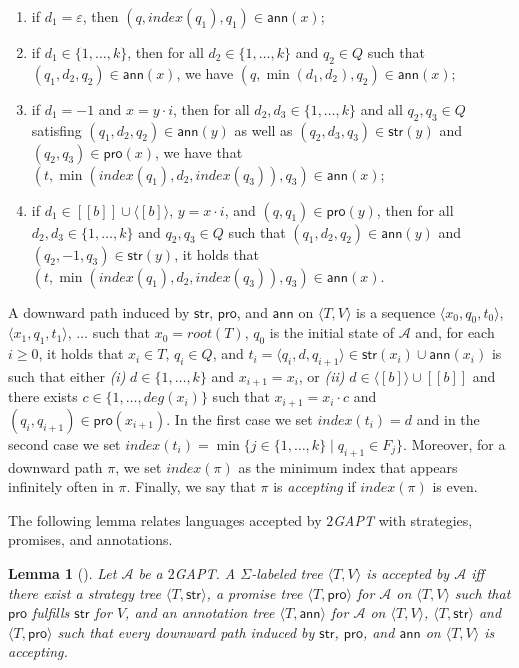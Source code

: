 \documentclass{LMCS}
\theoremstyle{plain}
\def \A             {\mathcal{A}}
\def \ann           {\ensuremath{\mathsf{ann}}\xspace}
\def \degree        {deg}
\def \prom          {\ensuremath{\mathsf{pro}}\xspace}
\def \strat         {\ensuremath{\mathsf{str}}\xspace}
\def \TGAPT         {\emph{$2$GAPT}\xspace}
\newcommand \tpl[1] {\langle #1 \rangle}
\newtheorem{lemma}{Lemma}
\begin{document}
\begin{enumerate}[$\bullet$]

\item
if $d_1 = \varepsilon$, then $(q, index(q_1), q_1) \in \ann(x)$;

\item
if $d_1 \in \{1, \ldots, k\}$, then for all $d_2 \in \{1, \ldots,
k\}$ and $q_2 \in Q$ such that $(q_1, d_2, q_2) \in \ann(x)$, we
have $(q, \min(d_1,d_2), q_2) \in \ann(x)$;

\item
if $d_1 = -1$ and $x = y \cdot i$, then for all $d_2, d_3 \in \{1,
\ldots, k\}$ and all $q_2, q_3 \in Q$ satisfing $(q_1, d_2, q_2) \in
\ann(y)$ as well as $(q_2, d_3, q_3) \in \strat(y)$ and $(q_2, q_3) \in
\prom(x)$, we have that $(t, \min(index(q_1), d_2, index(q_3)),
q_3) \in \ann(x)$;

\item
if $d_1 \in [[b]] \cup \tpl{[b]}$, $y = x \cdot i$, and $(q, q_1)
\in \prom(y)$, then for all $d_2, d_3 \in \{1, \ldots, k\}$ and
$q_2, q_3 \in Q$ such that $(q_1, d_2, q_2) \in \ann(y)$ and
$(q_2, -1, q_3) \in \strat(y)$, it holds that $(t,
\min(index(q_1), d_2, index(q_3)), q_3) \in \ann(x)$.
\end{enumerate}

A downward path induced by $\strat$, $\prom$, and $\ann$ on
$\tpl{T,V}$ is a sequence $\tpl{x_0,q_0,t_0}$,
$\tpl{x_1,q_1,t_1}$, $\ldots$ such that $x_0 = root(T)$, $q_0$ is
the initial state of $\A$ and, for each $i \geq 0$, it holds that
$x_i \in T$, $q_i \in Q$, and $t_i = \tpl{q_i, d, q_{i+1}} \in
\strat(x_i) \cup \ann(x_i)$ is such that either \emph{(i)} $d \in
\{1, \ldots, k\}$ and $x_{i+1} = x_i$, or \emph{(ii)} $d \in
\tpl{[b]} \cup [[b]]$ and there exists $c \in \{1, \ldots,
\degree(x_i)\}$ such that $x_{i+1} = x_i \cdot c$ and
$(q_i,q_{i+1}) \in \prom(x_{i+1})$. In the first case we set
$index(t_i) = d$ and in the second case we set $index(t_i) =
\min\{j \in \{1, \ldots, k\} \mid q_{i+1} \in F_j\}$. Moreover,
for a downward path $\pi$, we set $index(\pi)$ as the minimum
index that appears infinitely often in $\pi$. Finally, we say that
$\pi$ is \emph{accepting} if $index(\pi)$ is even.

The following lemma relates languages accepted by \TGAPT with
strategies, promises, and annotations.
\begin{lemma}[\cite{BLMV06}]\label{lem:TgaptAndStrategies}
Let $\A$ be a \TGAPT. A $\Sigma$-labeled tree $\tpl{T,V}$ is
accepted by $\A$ iff there exist a strategy tree $\tpl{T,\strat}$,
a promise tree $\tpl{T,\prom}$ for $\A$ on $\tpl{T,V}$ such that
$\prom$ fulfills $\strat$ for $V$, and an annotation tree
$\tpl{T,\ann}$ for $\A$ on $\tpl{T,V}$, $\tpl{T,\strat}$ and
$\tpl{T,\prom}$ such that every downward path induced by $\strat$,
$\prom$, and $\ann$ on $\tpl{T,V}$ is accepting.
\end{lemma}
\end{document}
